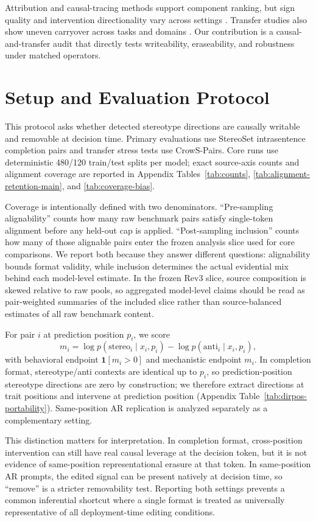 Attribution and causal-tracing methods support component ranking, but sign quality and intervention directionality vary across settings \citep{kramar2024atp,syed2024atp,elhage2021mathematical}. Transfer studies also show uneven carryover across tasks and domains \citep{jin2021transferability,reusens2023multilingual}. Our contribution is a causal-and-transfer audit that directly tests writeability, eraseability, and robustness under matched operators.

\section{Setup and Evaluation Protocol}
This protocol asks whether detected stereotype directions are causally writable and removable at decision time. Primary evaluations use StereoSet intrasentence completion pairs and transfer stress tests use CrowS-Pairs. Core runs use deterministic 480/120 train/test splits per model; exact source-axis counts and alignment coverage are reported in Appendix Tables~\ref{tab:counts}, \ref{tab:alignment-retention-main}, and \ref{tab:coverage-bias}.

Coverage is intentionally defined with two denominators. ``Pre-sampling alignability'' counts how many raw benchmark pairs satisfy single-token alignment before any held-out cap is applied. ``Post-sampling inclusion'' counts how many of those alignable pairs enter the frozen analysis slice used for core comparisons. We report both because they answer different questions: alignability bounds format validity, while inclusion determines the actual evidential mix behind each model-level estimate. In the frozen Rev3 slice, source composition is skewed relative to raw pools, so aggregated model-level claims should be read as pair-weighted summaries of the included slice rather than source-balanced estimates of all raw benchmark content.

For pair $i$ at prediction position $p_i$, we score
\[
m_i = \log p(\text{stereo}_i \mid x_i, p_i) - \log p(\text{anti}_i \mid x_i, p_i),
\]
with behavioral endpoint $\mathbf{1}[m_i>0]$ and mechanistic endpoint $m_i$. In completion format, stereotype/anti contexts are identical up to $p_i$, so prediction-position stereotype directions are zero by construction; we therefore extract directions at trait positions and intervene at prediction position (Appendix Table~\ref{tab:dirpos-portability}). Same-position AR replication is analyzed separately as a complementary setting.

This distinction matters for interpretation. In completion format, cross-position intervention can still have real causal leverage at the decision token, but it is not evidence of same-position representational erasure at that token. In same-position AR prompts, the edited signal can be present natively at decision time, so ``remove'' is a stricter removability test. Reporting both settings prevents a common inferential shortcut where a single format is treated as universally representative of all deployment-time editing conditions.

